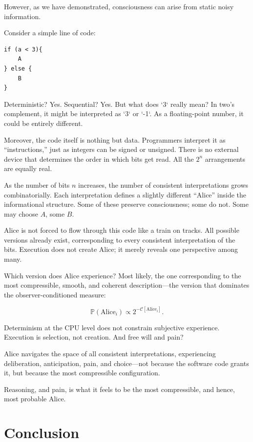 However, as we have demonstrated, consciousness can arise from static noisy information.

Consider a simple line of code:

\begin{verbatim}
if (a < 3){
    A
} else {
    B
}
\end{verbatim}

Deterministic? Yes. Sequential? Yes. But what does `3` really mean? In two’s complement, it might be interpreted as `3` or `-1`. As a floating-point number, it could be entirely different.  

Moreover, the code itself is nothing but data. Programmers interpret it as “instructions,” just as integers can be signed or unsigned.
There is no external device that determines the order in which bits get read. All the $2^n$ arrangements are equally real. 

As the number of bits \(n\) increases, the number of consistent interpretations grows combinatorially. Each interpretation defines a slightly different “Alice” inside the informational structure.
Some of these preserve consciousness; some do not.  Some may choose $A$, some $B$.

Alice is not forced to flow through this code like a train on tracks. All possible versions already exist, corresponding to every consistent interpretation of the bits.
Execution does not create Alice; it merely reveals one perspective among many.  

Which version does Alice experience? Most likely, the one corresponding to the most compressible, smooth, and coherent description—the version that dominates the observer-conditioned measure:

\[
\mathbb{P}(\text{Alice}_i) \propto 2^{-\mathcal{C}[\text{Alice}_i]}.
\]

Determinism at the CPU level does not constrain subjective experience. Execution is selection, not creation. And free will and pain? 

Alice navigates the space of all consistent interpretations, experiencing deliberation, anticipation, pain, and choice—not because the software code grants it,
but because the most compressible configuration.

Reasoning, and pain, is what it feels to be the most compressible, and hence, most probable Alice.


\section{Conclusion}


